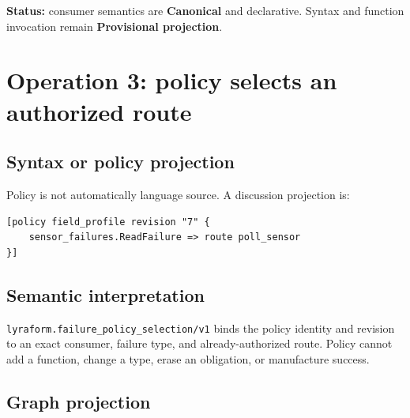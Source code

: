\documentclass[11pt,a4paper]{article}
\newcommand{\canonical}{\textcolor{LyraGreen}{\textbf{Canonical}}\xspace}
\newcommand{\provisional}{\textcolor{LyraAmber}{\textbf{Provisional projection}}\xspace}
\newcommand{\code}[1]{\texttt{#1}}
\begin{document}
\textbf{Status:} consumer semantics are \canonical and declarative. Syntax and
function invocation remain \provisional.

\section{Operation 3: policy selects an authorized route}

\subsection*{Syntax or policy projection}

Policy is not automatically language source. A discussion projection is:

\begin{lstlisting}[style=lyraform]
[policy field_profile revision "7" {
    sensor_failures.ReadFailure => route poll_sensor
}]
\end{lstlisting}

\subsection*{Semantic interpretation}

\code{lyraform.failure\_policy\_selection/v1} binds the policy identity and
revision to an exact consumer, failure type, and already-authorized route.
Policy cannot add a function, change a type, erase an obligation, or manufacture
success.

\subsection*{Graph projection}

\begin{center}
\end{center}
\end{document}
